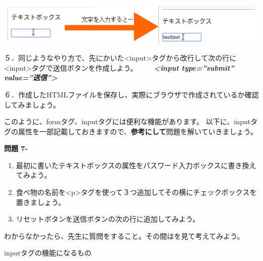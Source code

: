 \documentclass[a4paper,12pt,dvipdfmx]{jarticle}
\newcounter{Question}
\renewcommand\theQuestion{\textbf{問題 7-\arabic{Question}}}
\begin{document}
\centering
\includegraphics[width=16.3cm]{ome7-img037.png}
\flushleft

５．同じようなやり方で、先にかいた{\textless}input{\textgreater}タグから改行して次の行に{\textless}input{\textgreater}タグで送信ボタンを作成しよう。\newline
\ \ \ \ \textbf{\textit{{\textless}input type=”submit” value=”送信”{\textgreater}}}

６．作成したHTMLファイルを保存し、実際にブラウザで作成されているか確認してみましょう。\newline


このように、formタグ、inputタグには便利な機能があります。\newline
以下に、inputタグの属性を一部記載しておきますので、\textbf{参考にして}問題を解いていきましょう。


\bigskip

\clearpage
{}\theQuestion\newline
\begin{enumerate}
	\item 最初に書いたテキストボックスの属性をパスワード入力ボックスに書き換えてみよう。
	\item 食べ物の名前を{\textless}p{\textgreater}タグを使って３つ追加してその横にチェックボックスを置きましょう。
	\item リセットボタンを送信ボタンの次の行に追加してみよう。
\end{enumerate}

\samepage

わからなかったら、先生に質問をすること。その間はを見て考えてみよう。

inputタグの機能になるもの
\end{document}
